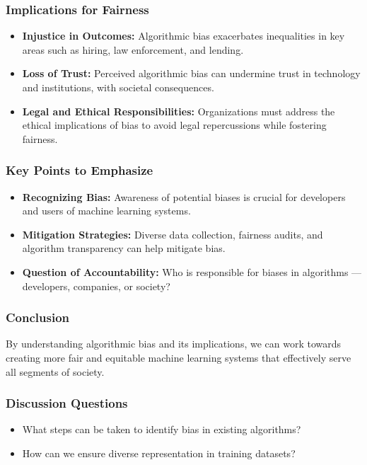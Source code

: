 \documentclass[aspectratio=169]{beamer}
\begin{document}
\begin{frame}[fragile]
    \frametitle{Implications for Fairness}
    \begin{itemize}
        \item \textbf{Injustice in Outcomes:} Algorithmic bias exacerbates inequalities in key areas such as hiring, law enforcement, and lending.
        \item \textbf{Loss of Trust:} Perceived algorithmic bias can undermine trust in technology and institutions, with societal consequences.
        \item \textbf{Legal and Ethical Responsibilities:} Organizations must address the ethical implications of bias to avoid legal repercussions while fostering fairness.
    \end{itemize}
\end{frame}

\begin{frame}[fragile]
    \frametitle{Key Points to Emphasize}
    \begin{itemize}
        \item \textbf{Recognizing Bias:} Awareness of potential biases is crucial for developers and users of machine learning systems.
        \item \textbf{Mitigation Strategies:} Diverse data collection, fairness audits, and algorithm transparency can help mitigate bias.
        \item \textbf{Question of Accountability:} Who is responsible for biases in algorithms — developers, companies, or society?
    \end{itemize}
\end{frame}

\begin{frame}[fragile]
    \frametitle{Conclusion}
    By understanding algorithmic bias and its implications, we can work towards creating more fair and equitable machine learning systems that effectively serve all segments of society.
\end{frame}

\begin{frame}[fragile]
    \frametitle{Discussion Questions}
    \begin{itemize}
        \item What steps can be taken to identify bias in existing algorithms?
        \item How can we ensure diverse representation in training datasets?
    \end{itemize}
\end{frame}
\end{document}
